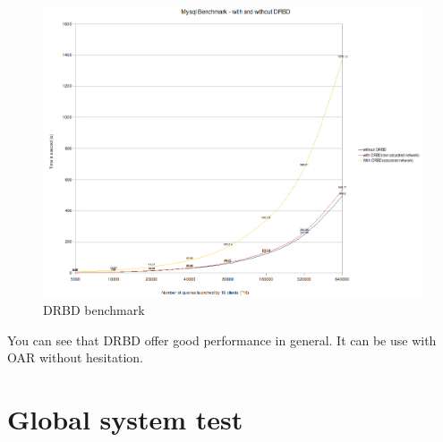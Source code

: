 \documentclass[a4paper,10pt]{report}
\begin{document}
\begin{figure}[H]
\begin{center}
\includegraphics[scale=0.5]{schema/drbd-test.png}
\end{center}
\caption{DRBD benchmark} 
\label{hb-gui-2nodes} 
\end{figure}

You can see that DRBD offer good performance in general. It can be use with OAR without hesitation.



\section{Global system test}
\end{document}

